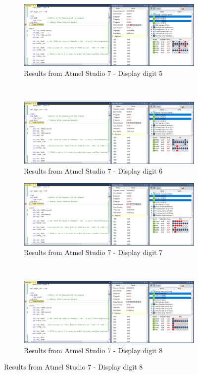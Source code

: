 \documentclass{article}
\begin{document}
\begin{figure}[h!]
		\begin{subfigure}[t]{0.5\textwidth}
			\centering
			\includegraphics[width=\linewidth]{./results/lab2_sim_dig5.png}
			\caption{Results from Αtmel Studio 7 - Display digit 5}
		\end{subfigure}%
		~
		\begin{subfigure}[t]{0.5\textwidth}
			\centering
			\includegraphics[width=\linewidth]{./results/lab2_sim_dig6.png}
			\caption{Results from Αtmel Studio 7 - Display digit 6}
		\end{subfigure}%
		
		\begin{subfigure}[t]{0.5\textwidth}
			\centering
			\includegraphics[width=\linewidth]{./results/lab2_sim_dig7.png}
			\caption{Results from Αtmel Studio 7 - Display digit 7}
		\end{subfigure}%
		~
		\begin{subfigure}[t]{0.5\textwidth}
			\centering
			\includegraphics[width=\linewidth]{./results/lab2_sim_dig8.png}
			\caption{Results from Αtmel Studio 7 - Display digit 8}
		\end{subfigure}
	
	\end{figure}
\end{document}

